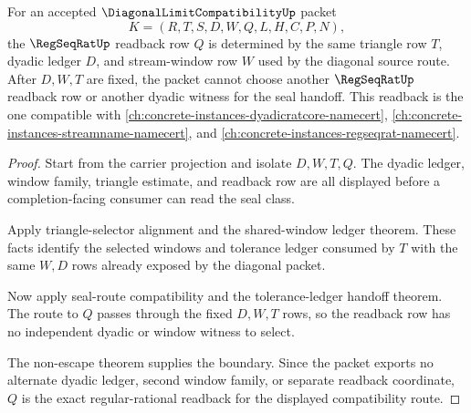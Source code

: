 \begin{theorem}
\label{thm:diagonal-limit-compatibility-regular-readback-exactness}
For an accepted $\DiagonalLimitCompatibilityUp$ packet
$$
K=(R,T,S,D,W,Q,L,H,C,P,N),
$$
the $\RegSeqRatUp$ readback row $Q$ is determined by the same triangle row
$T$, dyadic ledger $D$, and stream-window row $W$ used by the diagonal source
route. After $D,W,T$ are fixed, the packet cannot choose another
$\RegSeqRatUp$ readback row or another dyadic witness for the seal handoff.
This readback is the one compatible with
\autoref{ch:concrete-instances-dyadicratcore-namecert},
\autoref{ch:concrete-instances-streamname-namecert}, and
\autoref{ch:concrete-instances-regseqrat-namecert}.
\end{theorem}
\begin{proof}
Start from the carrier projection and isolate $D,W,T,Q$. The dyadic ledger,
window family, triangle estimate, and readback row are all displayed before a
completion-facing consumer can read the seal class.

Apply triangle-selector alignment and the shared-window ledger theorem. These
facts identify the selected windows and tolerance ledger consumed by $T$ with
the same $W,D$ rows already exposed by the diagonal packet.

Now apply seal-route compatibility and the tolerance-ledger handoff theorem.
The route to $Q$ passes through the fixed $D,W,T$ rows, so the readback row
has no independent dyadic or window witness to select.

The non-escape theorem supplies the boundary. Since the packet exports no
alternate dyadic ledger, second window family, or separate readback
coordinate, $Q$ is the exact regular-rational readback for the displayed
compatibility route.
\end{proof}

